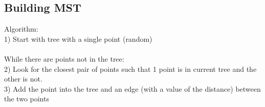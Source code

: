 \subsection*{Building MST}
Algorithm:\\
1) Start with tree with a single point (random)\\\\
While there are points not in the tree:\\
2) Look for the closest pair of points such that 1 point is in current tree and the other is not.\\
3) Add the point into the tree and an edge (with a value of the distance) between the two points

